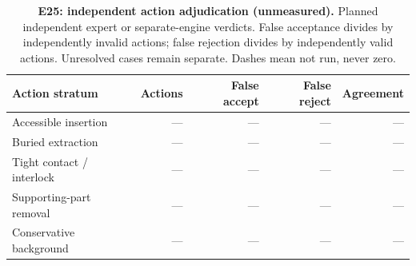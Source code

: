 \begin{table}[!ht]
\centering\small
\caption{\textbf{E25: independent action adjudication (unmeasured).} Planned independent expert or separate-engine verdicts. False acceptance divides by independently invalid actions; false rejection divides by independently valid actions. Unresolved cases remain separate. Dashes mean not run, never zero.}
\begin{tabularx}{\textwidth}{@{}Xrrrr@{}}\toprule
Action stratum & Actions & False accept & False reject & Agreement\\\midrule
Accessible insertion & --- & --- & --- & ---\\
Buried extraction & --- & --- & --- & ---\\
Tight contact / interlock & --- & --- & --- & ---\\
Supporting-part removal & --- & --- & --- & ---\\
Conservative background & --- & --- & --- & ---\\
\bottomrule
\end{tabularx}
\end{table}
